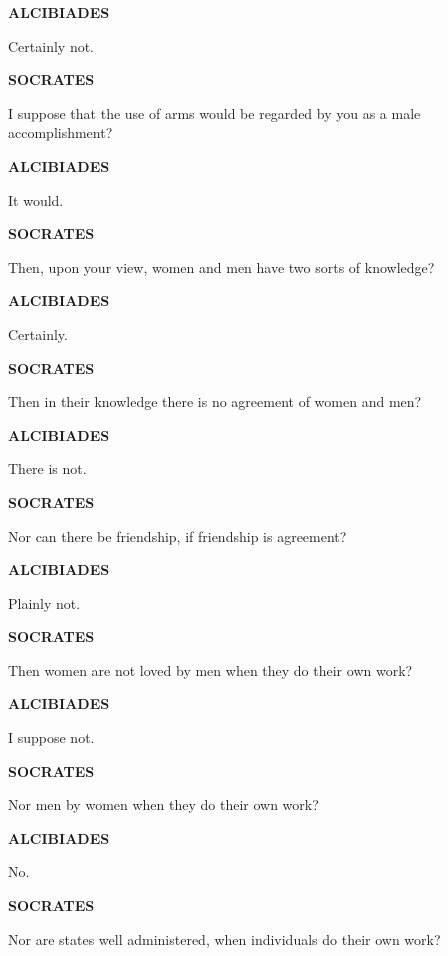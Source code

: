 \documentclass[11pt,letter]{article}
\begin{document}
\par \textbf{ALCIBIADES}
\par   Certainly not.

\par \textbf{SOCRATES}
\par   I suppose that the use of arms would be regarded by you as a male accomplishment?

\par \textbf{ALCIBIADES}
\par   It would.

\par \textbf{SOCRATES}
\par   Then, upon your view, women and men have two sorts of knowledge?

\par \textbf{ALCIBIADES}
\par   Certainly.

\par \textbf{SOCRATES}
\par   Then in their knowledge there is no agreement of women and men?

\par \textbf{ALCIBIADES}
\par   There is not.

\par \textbf{SOCRATES}
\par   Nor can there be friendship, if friendship is agreement?

\par \textbf{ALCIBIADES}
\par   Plainly not.

\par \textbf{SOCRATES}
\par   Then women are not loved by men when they do their own work?

\par \textbf{ALCIBIADES}
\par   I suppose not.

\par \textbf{SOCRATES}
\par   Nor men by women when they do their own work?

\par \textbf{ALCIBIADES}
\par   No.

\par \textbf{SOCRATES}
\par   Nor are states well administered, when individuals do their own work?
\end{document}
